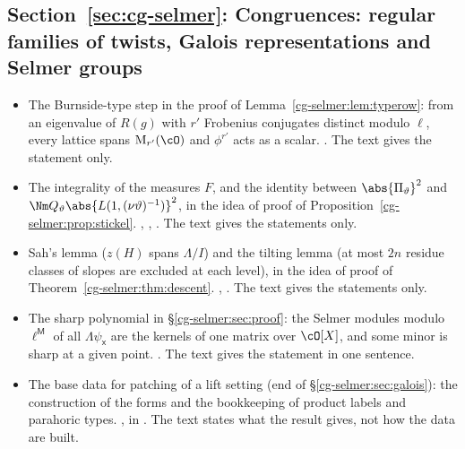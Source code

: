 \subsection*{Section~\ref{sec:cg-selmer}: Congruences: regular families of twists, Galois representations and Selmer groups}
\begin{itemize}[leftmargin=2em,itemsep=1pt]
\item The Burnside-type step in the proof of Lemma~\ref{cg-selmer:lem:typerow}: from an eigenvalue
  of $R(g)$ with $r'$ Frobenius conjugates distinct modulo $\ell$, every lattice spans
  $\mathrm M_{r'}(\cO)$ and $\phi^{r'}$ acts as a scalar.
  . The text gives the
  statement only.
\item The integrality of the measures $F$, and the identity between $\abs{\Pi_\vartheta}^2$ and
  $\Nm Q_\vartheta\abs{L(1,(\nu\vartheta)^{-1})}^2$, in the idea of proof of
  Proposition~\ref{cg-selmer:prop:stickel}.
  ,
  ,
  . The text gives the statements only.
\item Sah's lemma ($z(H)$ spans $\Lambda/I$) and the tilting lemma (at most $2n$ residue classes of
  slopes are excluded at each level), in the idea of proof of Theorem~\ref{cg-selmer:thm:descent}.
  , . The text
  gives the statements only.
\item The sharp polynomial in \S\ref{cg-selmer:sec:proof}: the Selmer modules modulo
  $\ell^{\mathsf M}$ of all $\Lambda\psi_{\mathsf x}$ are the kernels of one matrix over $\cO[X]$,
  and some minor is sharp at a given point. . The text
  gives the statement in one sentence.
\item The base data for patching of a lift setting (end of \S\ref{cg-selmer:sec:galois}): the
  construction of the forms and the bookkeeping of product labels and parahoric types.
  , in
  . The text states what the
  result gives, not how the data are built.
\end{itemize}

